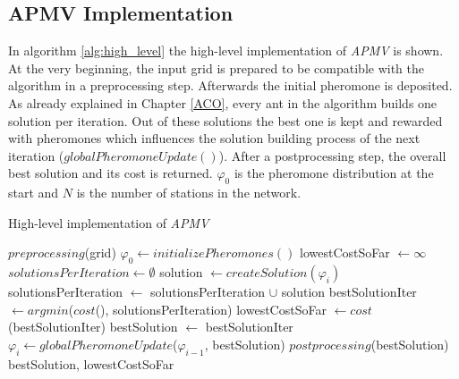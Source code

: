 \subsection{APMV Implementation}
In algorithm \ref{alg:high_level} the high-level implementation of \textit{APMV} is shown. At the very beginning, the input grid is prepared to be compatible with the algorithm in a preprocessing step. Afterwards the initial pheromone is deposited. As already explained in Chapter \ref{ACO}, every ant in the algorithm builds one solution per iteration. Out of these solutions the best one is kept and rewarded with pheromones which influences the solution building process of the next iteration ($globalPheromoneUpdate()$). After a postprocessing step, the overall best solution and its cost is returned. $\varphi_0$ is the pheromone distribution at the start and $N$ is the number of stations in the network.

\begin{algorithm}[h]
	\caption{High-level implementation of \textit{APMV}}
	\label{alg:high_level}
	\begin{algorithmic}[1]
		\State $preprocessing$(grid) 
		\State $\varphi_0 \gets initializePheromones()$ 
		\State lowestCostSoFar $\gets \infty$ 
		\State $solutionsPerIteration \gets \emptyset$
		\State solution $\gets createSolution(\varphi_i)$
		\State solutionsPerIteration $\gets$ solutionsPerIteration $\cup$ solution
		\EndFor
		\State bestSolutionIter $\gets argmin$($cost$(), solutionsPerIteration)
		\State lowestCostSoFar $\gets cost$(bestSolutionIter)
		\State bestSolution $\gets$ bestSolutionIter
		\EndIf
		\State $\varphi_i \gets globalPheromoneUpdate$($\varphi_{i-1}$, bestSolution)
		\EndFor
		\State $postprocessing$(bestSolution) 
		\State \Return bestSolution, lowestCostSoFar
	\end{algorithmic}
\end{algorithm}

